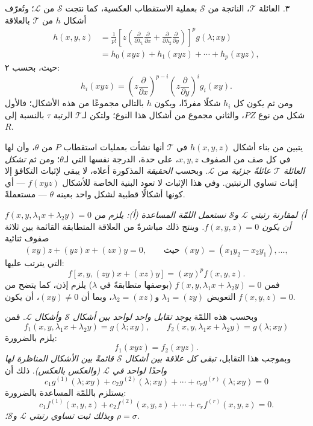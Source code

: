 \documentclass[11pt]{article}
\begin{document}
٣. العائلة $\mathcal T$، الناتجة من $\mathcal S$ بعملية الاستقطاب العكسية، كما نتجت $\mathcal S$ من $\mathcal L$؛ وتُعرّف أشكال $h$ من $\mathcal T$ بالعلاقة
\[
\begin{aligned}
 h(x,y,z)
 &=\frac1{p!}\left[z\left(\frac{\partial}{\partial\lambda_1}\frac{\partial}{\partial x}
 +\frac{\partial}{\partial\lambda_2}\frac{\partial}{\partial y}\right)\right]^p g(\lambda;xy)\\
 &=h_0(xyz)+h_1(xyz)+\cdots+h_p(xyz),
\end{aligned}
\]
حيث، بحسب ٢:
\[
  h_i(xyz)=
  \left(z\frac{\partial}{\partial x}\right)^{p-i}
  \left(z\frac{\partial}{\partial y}\right)^i g_i(xy).
\]
ومن ثم يكون كل $h_i$ شكلًا مفردًا، ويكون $h$ بالتالي مجموعًا من هذه الأشكال؛ فالأول شكل من نوع $PZ$، والثاني مجموع من أشكال هذا النوع؛ ولتكن لـ$\mathcal T$ الرتبة $\tau$ بالنسبة إلى $R$.

يتبين من بناء أشكال $h(x,y,z)$ في $\mathcal T$ أنها نشأت بعمليات استقطاب $P$ من $\theta$، وأن لها في كل صف من الصفوف $x,y,z$، على حدة، الدرجة نفسها التي لـ$\theta$؛ ومن ثم \emph{تشكل العائلة $\mathcal T$ عائلةً جزئية من $\mathcal L$}. وبحسب \emph{الحقيقة} المذكورة أعلاه، لا يبقى لإثبات التكافؤ إلا إثبات تساوي الرتبتين. وفي هذا الإثبات لا تعود البنية الخاصة للأشكال $f(xyz)$ --- أي كونها أشكالًا قطبية لشكل واحد بعينه $\theta$ --- مستعملةً.

\emph{أ) لمقارنة رتبتي $\mathcal L$ و$\mathcal S$ نستعمل اللمّة المساعدة (أ): يلزم من $f(x,y,\lambda_1x+\lambda_2y)=0$ أن يكون $f(x,y,z)=0$.} وينتج ذلك مباشرةً من العلاقة المتطابقة القائمة بين ثلاثة صفوف ثنائية
\[
  (xy)z+(yz)x+(zx)y=0,
  \qquad \text{حيث }(xy)=(x_1y_2-x_2y_1),\ldots,
\]
التي يترتب عليها:
\[
  f[x,y,(zy)x+(xz)y]=(xy)^p f(x,y,z).
\]
فمن $f(x,y,\lambda_1x+\lambda_2y)=0$ (بوصفها متطابقةً في $\lambda$) يلزم إذن، كما يتضح من التعويض $\lambda_1=(zy)$ و$\lambda_2=(xz)$، وبما أن $(xy)\ne0$، أن يكون $f(x,y,z)=0$.

وبحسب هذه اللمّة \emph{يوجد تقابل واحد لواحد بين أشكال $\mathcal S$ وأشكال $\mathcal L$}. فمن
\[
  f_1(x,y,\lambda_1x+\lambda_2y)=g(\lambda;xy),\qquad
  f_2(x,y,\lambda_1x+\lambda_2y)=g(\lambda;xy)
\]
يلزم بالضرورة:
\[
  f_1(xyz)=f_2(xyz).
\]
وبموجب هذا التقابل، \emph{تبقى كل علاقة بين أشكال $\mathcal S$ قائمةً بين الأشكال المناظرة لها واحدًا لواحد في $\mathcal L$ (والعكس بالعكس)}. ذلك أن
\[
  c_1g^{(1)}(\lambda;xy)+c_2g^{(2)}(\lambda;xy)+\cdots+c_rg^{(r)}(\lambda;xy)=0
\]
يستلزم باللمّة المساعدة بالضرورة:
\[
  c_1f^{(1)}(x,y,z)+c_2f^{(2)}(x,y,z)+\cdots+c_rf^{(r)}(x,y,z)=0.
\]
\emph{وبذلك ثبت تساوي رتبتي $\mathcal L$ و$\mathcal S$؛ $\rho=\sigma$.}
\end{document}
